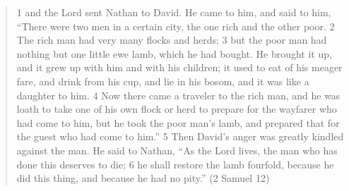 \documentclass[11pt]{article}
\begin{document}
\begin{quote}
1 and the Lord sent Nathan to David. He came to him, and said to him, “There were two men in a certain city, the one rich and the other poor. 2 The rich man had very many flocks and herds; 3 but the poor man had nothing but one little ewe lamb, which he had bought. He brought it up, and it grew up with him and with his children; it used to eat of his meager fare, and drink from his cup, and lie in his bosom, and it was like a daughter to him. 4 Now there came a traveler to the rich man, and he was loath to take one of his own flock or herd to prepare for the wayfarer who had come to him, but he took the poor man’s lamb, and prepared that for the guest who had come to him.” 5 Then David’s anger was greatly kindled against the man. He said to Nathan, “As the Lord lives, the man who has done this deserves to die; 6 he shall restore the lamb fourfold, because he did this thing, and because he had no pity.”
(2 Samuel 12)
\end{quote}
\end{document}
